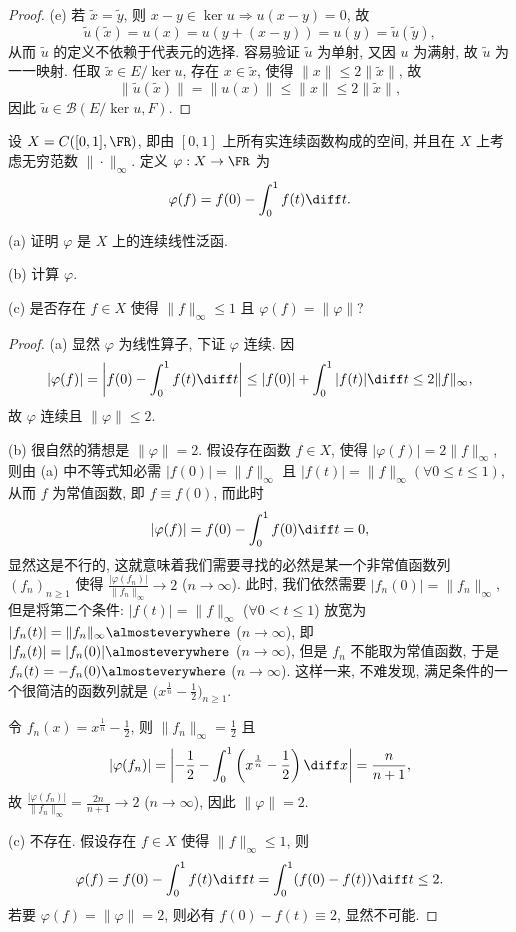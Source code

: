 \documentclass{mathexercise}
\begin{document}
\begin{proof}
    (e) 若 $\tilde{x}=\tilde{y}$, 则 $x-y\in\ker u\Rightarrow u(x-y)=0$, 故
    \[\tilde{u}(\tilde{x})=u(x)=u(y+(x-y))=u(y)=\tilde{u}(\tilde{y}),\]
    从而 $\tilde{u}$ 的定义不依赖于代表元的选择. 容易验证 $\tilde{u}$ 为单射,
    又因 $u$ 为满射, 故 $\tilde{u}$ 为一一映射. 任取 $\tilde{x}\in E/\ker u$,
    存在 $x\in\tilde{x}$, 使得 $\|x\|\leq 2\|\tilde{x}\|$, 故
    \[\|\tilde{u}(\tilde{x})\|=\|u(x)\|\leq \|x\|\leq 2\|\tilde{x}\|,\]
    因此 $\tilde{u}\in\mathcal{B}(E/\ker u,F)$.
\end{proof}




\begin{exercise}
    设 $X=C([0,1],\FR)$, 即由 $[0,1]$ 上所有实连续函数构成的空间,
    并且在 $X$ 上考虑无穷范数 $\|\cdot\|_{\infty}$. 定义 $\varphi:X\to\FR$ 为
    \[\varphi(f)=f(0)-\int_0^1 f(t)\diff t.\]

    (a) 证明 $\varphi$ 是 $X$ 上的连续线性泛函.

    (b) 计算 $\varphi$.

    (c) 是否存在 $f\in X$ 使得 $\|f\|_{\infty}\leq 1$ 且 $\varphi(f)=\|\varphi\|$?
\end{exercise}

\begin{proof}
    (a) 显然 $\varphi$ 为线性算子, 下证 $\varphi$ 连续. 因
    \[|\varphi(f)|=\left\lvert f(0)-\int_0^1 f(t)\diff t\right\rvert\leq|f(0)|+\int_0^1 |f(t)|\diff t\leq 2\|f\|_{\infty},\]
    故 $\varphi$ 连续且 $\|\varphi\|\leq 2$.

    (b) 很自然的猜想是 $\|\varphi\|=2$. 假设存在函数 $f\in X$, 使得
    $|\varphi(f)|=2\|f\|_{\infty}$, 则由 (a) 中不等式知必需
    $|f(0)|=\|f\|_{\infty}$ 且 $|f(t)|=\|f\|_{\infty}(\forall 0\leq t\leq 1)$,
    从而 $f$ 为常值函数, 即 $f\equiv f(0)$, 而此时
    \[|\varphi(f)|=f(0)-\int_0^1 f(0)\diff t=0,\]
    显然这是不行的, 这就意味着我们需要寻找的必然是某一个非常值函数列
    $(f_n)_{n\geq 1}$ 使得 $\frac{|\varphi(f_n)|}{\|f_n\|_{\infty}}\to 2$ ($n\to\infty$).
    此时, 我们依然需要 $|f_n(0)|=\|f_n\|_{\infty}$, 但是将第二个条件:
    $|f(t)|=\|f\|_{\infty}$ ($\forall 0<t\leq 1$) 放宽为
    $|f_n(t)|=\|f_n\|_{\infty}\almosteverywhere$ ($n\to\infty$),
    即 $|f_n(t)|=|f_n(0)|\almosteverywhere$ ($n\to\infty$),
    但是 $f_n$ 不能取为常值函数,
    于是 $f_n(t)=-f_n(0)\almosteverywhere$ ($n\to\infty$).
    这样一来, 不难发现, 满足条件的一个很简洁的函数列就是
    $\big(x^{\frac{1}{n}}-\frac{1}{2}\big)_{n\geq 1}$.

    令 $f_n(x)=x^{\frac{1}{n}}-\frac{1}{2}$, 则 $\|f_n\|_{\infty}=\frac{1}{2}$ 且
    \[|\varphi(f_n)|=\left\lvert-\frac{1}{2}-\int_0^1 \left(x^{\frac{1}{n}}-\frac{1}{2}\right)\diff x\right\rvert=\frac{n}{n+1},\]
    故 $\frac{|\varphi(f_n)|}{\|f_n\|_{\infty}}=\frac{2n}{n+1}\to 2$ ($n\to\infty$),
    因此 $\|\varphi\|=2$.

    (c) 不存在. 假设存在 $f\in X$ 使得 $\|f\|_{\infty}\leq 1$, 则
    \[\varphi(f)=f(0)-\int_0^1 f(t)\diff t=\int_0^1 (f(0)-f(t))\diff t\leq 2.\]
    若要 $\varphi(f)=\|\varphi\|=2$, 则必有 $f(0)-f(t)\equiv 2$, 显然不可能.
\end{proof}
\end{document}
